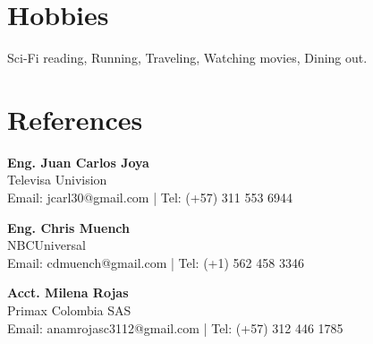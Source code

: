 \documentclass[11pt,a4paper]{article}
\begin{document}
\section*{Hobbies}
Sci-Fi reading, Running, Traveling, Watching movies, Dining out.

\section*{References}
\textbf{Eng. Juan Carlos Joya} \\
Televisa Univision \\
Email: jcarl30@gmail.com | Tel: (+57) 311 553 6944

\textbf{Eng. Chris Muench} \\
NBCUniversal \\
Email: cdmuench@gmail.com | Tel: (+1) 562 458 3346

\textbf{Acct. Milena Rojas} \\
Primax Colombia SAS \\
Email: anamrojasc3112@gmail.com | Tel: (+57) 312 446 1785
\end{document}
